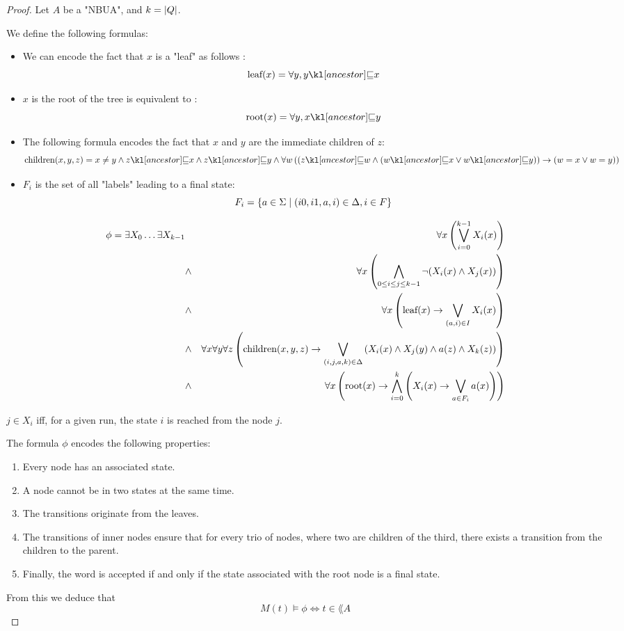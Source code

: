 \documentclass{article}
\begin{document}
\begin{proof}
	Let $A$ be a "NBUA", and $k = \left|Q\right|$.

	We define the following formulas:
	\begin{itemize}
		\item We can encode the fact that $ x $ is a "leaf" as follows :
		      \[\text{leaf} (x) = \forall y, \ancestor y x \]
		\item $x$ is the root of the tree is equivalent to :
		      \[\text{root} (x) = \forall y, \ancestor x y \]
		\item The following formula encodes the fact that $ x $ and $y$ are the immediate children of $z$:
		      \[\text{children} (x,y,z) =
			      x \neq y \land
			      \ancestor z x \land \ancestor z y \land
			      \forall w
			      \left(
			      \left(
				      \ancestor z w \land
					      (\ancestor w x \lor \ancestor w y) \right) \rightarrow (
				      w = x \lor w = y
				      )
			      \right) \]
		\item $F_i$ is the set of all "labels" leading to a final state:
		      \[F_i = \left\{a \in \Sigma \mid (i0,i1,a,i) \in \Delta, i \in F\right\}\]
	\end{itemize}

	\begin{eqnarray}
		\phi = \exists X_0 \ldots \exists X_{k-1} &\ & \forall x \left( \bigvee_{i=0}^{k-1} X_i(x) \right) \label{lem:AMSO1}\\
		&\land& \forall x \left( \bigwedge_{0 \leq i \leq j \leq k-1}  \lnot (X_i(x) \land X_j(x)) \right) \label{lem:AMSO2} \\
		&\land& \forall x  \left( \text{leaf} (x) \rightarrow \bigvee_{(a,i)\in I}  X_i(x) \right) \label{lem:AMSO3}\\
		&\land& \forall x \forall y \forall z \left(\text{children}(x,y,z) \rightarrow \bigvee_{(i,j,a,k)\in \Delta} \left(X_i(x) \land X_j(y) \land a(z) \land X_k(z)\right)\right) \label{lem:AMSO4} \\
		&\land& \forall x \left(\text{root}(x) \rightarrow \bigwedge_{i= 0}^k \left( X_i(x) \rightarrow \bigvee_{a \in F_i} a(x) \right)\right) \label{lem:AMSO5}
	\end{eqnarray}


	$j \in X_i$ iff, for a given run, the state $i$ is reached from the node $j$.

	The formula $\phi$ encodes the following properties:

	\begin{enumerate}
		\item Every node has an associated state.
		\item A node cannot be in two states at the same time.
		\item The transitions originate from the leaves.
		\item The transitions of inner nodes ensure that for every trio of nodes, where two are children of the third, there exists a transition from the children to the parent.
		\item Finally, the word is accepted if and only if the state associated with the root node is a final state.
	\end{enumerate}

	From this we deduce that
	\[ M(t) \models \phi \iff t \in \lang A \]
\end{proof}


\iffalse
	
	
\fi
\end{document}
